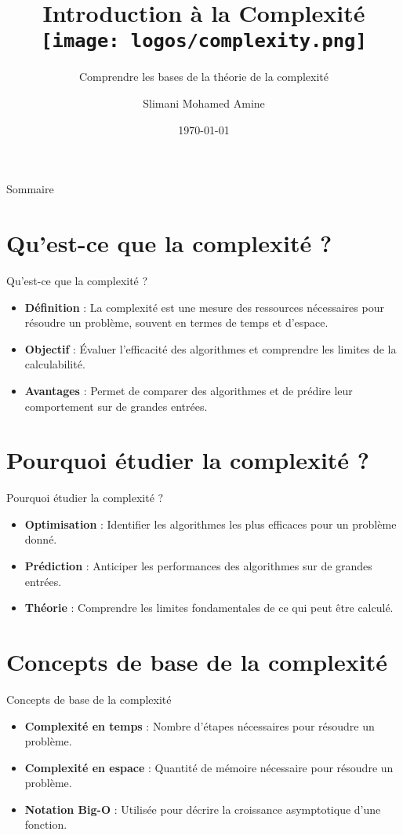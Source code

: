 \documentclass{clbeamer2024}
\title{
        Introduction à la Complexité
	\texttt{[image: logos/complexity.png]} \hfill
}
\subtitle{Comprendre les bases de la théorie de la complexité}
\author{Slimani Mohamed Amine}
\institute{EHTP}
\date{\today}
\begin{document}
	\setcounter{framenumber}{-1}
	\frame{\titlepage}
	
	
	
	\begin{frame}{Sommaire}
		\tableofcontents
	\end{frame}
	
	
	\section{Qu'est-ce que la complexité ?}
	\begin{frame}{Qu'est-ce que la complexité ?}
		\begin{itemize}
			\item \textbf{Définition} : La complexité est une mesure des ressources nécessaires pour résoudre un problème, souvent en termes de temps et d'espace.
			\item \textbf{Objectif} : Évaluer l'efficacité des algorithmes et comprendre les limites de la calculabilité.
			\item \textbf{Avantages} : Permet de comparer des algorithmes et de prédire leur comportement sur de grandes entrées.
		\end{itemize}
	\end{frame}
	
	\section{Pourquoi étudier la complexité ?}
	\begin{frame}{Pourquoi étudier la complexité ?}
		\begin{itemize}
			\item \textbf{Optimisation} : Identifier les algorithmes les plus efficaces pour un problème donné.
			\item \textbf{Prédiction} : Anticiper les performances des algorithmes sur de grandes entrées.
			\item \textbf{Théorie} : Comprendre les limites fondamentales de ce qui peut être calculé.
		\end{itemize}
	\end{frame}
	
	
	\section{Concepts de base de la complexité}
	\begin{frame}{Concepts de base de la complexité}
		\begin{itemize}
			\item \textbf{Complexité en temps} : Nombre d'étapes nécessaires pour résoudre un problème.
			\item \textbf{Complexité en espace} : Quantité de mémoire nécessaire pour résoudre un problème.
			\item \textbf{Notation Big-O} : Utilisée pour décrire la croissance asymptotique d'une fonction.
		\end{itemize}
	\end{frame}
	
\end{document}
